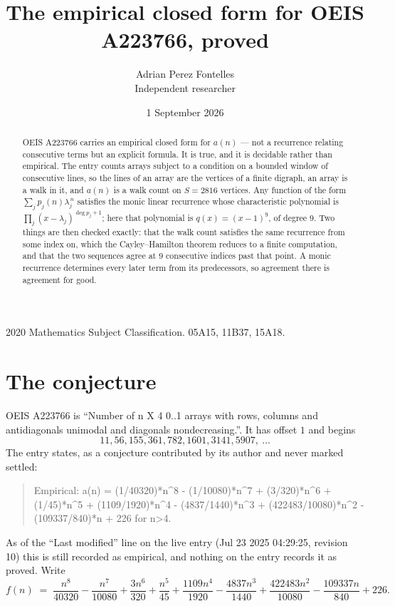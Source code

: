 \documentclass[11pt,a4paper]{article}
\title{The empirical closed form for OEIS A223766, proved}
\author{Adrian Perez Fontelles\\ \small Independent researcher}
\date{1 September 2026}
\theoremstyle{plain}
\theoremstyle{definition}
\begin{document}
\maketitle

\begin{abstract}
OEIS A223766 carries an empirical closed form for $a(n)$ --- not a recurrence relating
consecutive terms but an explicit formula. It is true, and it is decidable rather than
empirical. The entry counts arrays subject to a condition on a bounded window of consecutive lines, so the lines of an array are the
vertices of a finite digraph, an array is a walk in it, and $a(n)$ is a walk count on
$S=2816$ vertices. Any function of the form $\sum_j p_j(n)\lambda_j^{\,n}$ satisfies the
monic linear recurrence whose characteristic polynomial is
$\prod_j(x-\lambda_j)^{\deg p_j+1}$; here that polynomial is $q(x)=(x-1)^{9}$, of degree
$9$. Two things are then checked exactly: that the walk count satisfies the same
recurrence from some index on, which the Cayley--Hamilton theorem reduces to a finite
computation, and that the two sequences agree at $9$ consecutive indices past that
point. A monic recurrence determines every later term from its predecessors, so agreement
there is agreement for good.
\end{abstract}

\noindent\small 2020 Mathematics Subject Classification. 05A15, 11B37, 15A18.\normalsize

\section{The conjecture}

OEIS A223766 is ``Number of n X 4 0..1 arrays with rows, columns and antidiagonals unimodal and diagonals nondecreasing.''. It has offset $1$ and begins
\[
11, 56, 155, 361, 782, 1601, 3141, 5907,\ \dots
\]
The entry states, as a conjecture contributed by its author and never marked settled:
\begin{quote}
Empirical: a(n) = (1/40320)*n\^{}8 - (1/10080)*n\^{}7 + (3/320)*n\^{}6 + (1/45)*n\^{}5 + (1109/1920)*n\^{}4 - (4837/1440)*n\^{}3 + (422483/10080)*n\^{}2 - (109337/840)*n + 226 for n>4.
\end{quote}
As of the ``Last modified'' line on the live entry (Jul 23 2025 04:29:25, revision 10) this is still
recorded as empirical, and nothing on the entry records it as proved. Write
\[
f(n)\;=\;\frac{n^{8}}{40320} - \frac{n^{7}}{10080} + \frac{3 n^{6}}{320} + \frac{n^{5}}{45} + \frac{1109 n^{4}}{1920} - \frac{4837 n^{3}}{1440} + \frac{422483 n^{2}}{10080} - \frac{109337 n}{840} + 226.
\]
\end{document}
